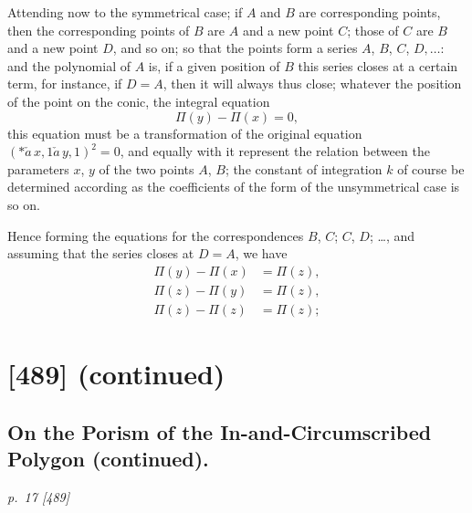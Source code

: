 \documentclass[11pt,a4paper]{book}
\begin{document}
Attending now to the symmetrical case; if $A$ and $B$ are corresponding points, then the corresponding points of $B$ are $A$ and a new point $C$; those of $C$ are $B$
and a new point $D$, and so on; so that the points form a series $A$, $B$, $C$, $D, \ldots$:
and the polynomial of $A$ is, if a given position of $B$ this series closes at a
certain term, for instance, if $D = A$, then it will always thus close; whatever the position of the point on the conic, the integral equation
\[
\Pi(y) - \Pi(x) = 0,
\]
this equation must be a transformation of the original equation $(*\!\check{a}\,x, 1\check{a}\,y, 1)^2 = 0$, and
equally with it represent the relation between the parameters $x$, $y$ of the two points
$A$, $B$; the constant of integration $k$ of course be determined according as
the coefficients of the form of the unsymmetrical case is so on.

Hence forming the equations for the correspondences $B$, $C$; $C$, $D$; \ldots, and assuming
that the series closes at $D = A$, we have
\begin{align*}
\Pi(y) - \Pi(x) &= \Pi(z), \\
\Pi(z) - \Pi(y) &= \Pi(z), \\
\Pi(z) - \Pi(z) &= \Pi(z) ;
\end{align*}

\clearpage
\clearpage


\section*{[489] \textnormal{(continued)}}
\subsection*{On the Porism of the In-and-Circumscribed Polygon (continued).}

\bigskip
\textit{p.~17 [489]}
\smallskip
\end{document}
